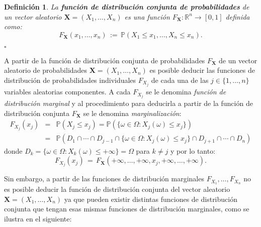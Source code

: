 \documentclass[spanish,10pt,letterpaper]{article}
\newtheorem{defi}{Definición}
\newcommand{\prob}{\mathbb{P}}
\newcommand{\Runo}{\mathbb{R}}
\newcommand{\qed}{\begin{flushright}$\square$\end{flushright}}
\begin{document}
\bigskip 

\begin{defi}\label{def:FndistribRn}
    La \textbf{función de distribución conjunta de probabilidades} de un vector aleatorio $\mathbf{X}=(X_1,\ldots,X_n)$ es una función $F_{\mathbf{X}}:\Runo^n\rightarrow[0,1]$ definida como:
    \begin{equation*}
        F_{\mathbf{X}}(x_1,\ldots,x_n) \,:=\, \prob(X_1\leq x_1,\ldots,X_n\leq x_n).
    \end{equation*} \qed 
\end{defi}

A partir de la función de distribución conjunta de probabilidades $F_{\mathbf{X}}$ de un vector aleatorio de probabilidades $\mathbf{X}=(X_1,\ldots,X_n)$ es posible deducir las funciones de distribución de probabilidades individuales $F_{X_j}$ de cada una de las $j\in\{1,\ldots,n\}$ variables aleatorias componentes. A cada $F_{X_j}$ se le denomina \textit{función de distribución marginal} y al procedimiento para deducirla a partir de la función de distribución conjunta $F_{\mathbf{X}}$ se le denomina \textit{marginalización}:
\begin{eqnarray*}
    F_{X_j}(x_j) &=& \prob(X_j\leq x_j) = \prob(\{\omega\in\Omega:X_j(\omega)\leq x_j\}) \\
                 &=& \prob(D_1 \cap \cdots \cap D_{j-1} \cap \{\omega\in\Omega:X_j(\omega)\leq x_j\} \cap D_{j+1} \cap \cdots \cap D_n)
\end{eqnarray*}
donde $D_k=\{\omega\in\Omega:X_k(\omega)\leq +\infty\}=\Omega$ para $k\neq j$ y por lo tanto:
\begin{equation}\label{eq:marginalizar} 
    F_{X_j}(x_j) \,=\, F_{\mathbf{X}}(+\infty,\ldots,+\infty,x_j,+\infty,\ldots,+\infty).
\end{equation}
    
\medskip

Sin embargo, a partir de las funciones de distribución marginales $F_{X_1},\ldots,F_{X_n}$ no es posible deducir la función de distribución conjunta del vector aleatorio $\mathbf{X}=(X_1,\ldots,X_n)$ ya que pueden existir distintas funciones de distribución conjunta que tengan esas mismas funciones de distribución marginales, como se ilustra en el siguiente:

\bigskip
\end{document}
